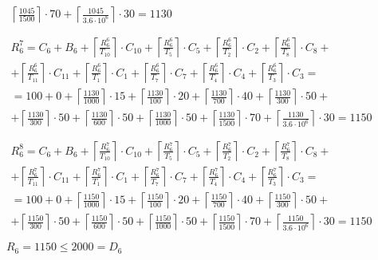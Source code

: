 \begin{gather*}
\begin{multlined}
    \left\lceil\frac{1045}{1500}\right\rceil\cdot 70 +%
    \left\lceil\frac{1045}{3.6 \cdot 10^6}\right\rceil\cdot 30 = 1130 \\
  \end{multlined} \\
  \begin{multlined}
    R_6^7 = C_6 + B_6 + \left\lceil\frac{R_6^6}{T_{10}}\right\rceil\cdot C_{10} + %
    \left\lceil\frac{R_6^6}{T_5}\right\rceil\cdot C_5 + %
    \left\lceil\frac{R_6^6}{T_2}\right\rceil\cdot C_2 + %
    \left\lceil\frac{R_6^6}{T_8}\right\rceil\cdot C_8 + \\%
    + \left\lceil\frac{R_6^6}{T_{11}}\right\rceil\cdot C_{11} + %
    \left\lceil\frac{R_6^6}{T_1}\right\rceil\cdot C_1 +%
    \left\lceil\frac{R_6^6}{T_7}\right\rceil\cdot C_7 +%
    \left\lceil\frac{R_6^6}{T_4}\right\rceil\cdot C_4 +%
    \left\lceil\frac{R_6^6}{T_3}\right\rceil\cdot C_3 = \\%
    = 100 + 0 + \left\lceil\frac{1130}{1000}\right\rceil\cdot 15 + %
    \left\lceil\frac{1130}{100}\right\rceil\cdot 20 + %
    \left\lceil\frac{1130}{700}\right\rceil\cdot 40 + %
    \left\lceil\frac{1130}{300}\right\rceil\cdot 50 + \\%
    + \left\lceil\frac{1130}{300}\right\rceil\cdot 50 + %
    \left\lceil\frac{1130}{600}\right\rceil\cdot 50 + %
    \left\lceil\frac{1130}{1000}\right\rceil\cdot 50 +%
    \left\lceil\frac{1130}{1500}\right\rceil\cdot 70 +%
    \left\lceil\frac{1130}{3.6 \cdot 10^6}\right\rceil\cdot 30 = 1150 \\
  \end{multlined} \\
  \begin{multlined}
    R_6^8 = C_6 + B_6 + \left\lceil\frac{R_6^7}{T_{10}}\right\rceil\cdot C_{10} + %
    \left\lceil\frac{R_6^7}{T_5}\right\rceil\cdot C_5 + %
    \left\lceil\frac{R_6^7}{T_2}\right\rceil\cdot C_2 + %
    \left\lceil\frac{R_6^7}{T_8}\right\rceil\cdot C_8 + \\%
    + \left\lceil\frac{R_6^7}{T_{11}}\right\rceil\cdot C_{11} + %
    \left\lceil\frac{R_6^7}{T_1}\right\rceil\cdot C_1 +%
    \left\lceil\frac{R_6^7}{T_7}\right\rceil\cdot C_7 +%
    \left\lceil\frac{R_6^7}{T_4}\right\rceil\cdot C_4 +%
    \left\lceil\frac{R_6^7}{T_3}\right\rceil\cdot C_3 = \\%
    = 100 + 0 + \left\lceil\frac{1150}{1000}\right\rceil\cdot 15 + %
    \left\lceil\frac{1150}{100}\right\rceil\cdot 20 + %
    \left\lceil\frac{1150}{700}\right\rceil\cdot 40 + %
    \left\lceil\frac{1150}{300}\right\rceil\cdot 50 + \\%
    + \left\lceil\frac{1150}{300}\right\rceil\cdot 50 + %
    \left\lceil\frac{1150}{600}\right\rceil\cdot 50 + %
    \left\lceil\frac{1150}{1000}\right\rceil\cdot 50 +%
    \left\lceil\frac{1150}{1500}\right\rceil\cdot 70 +%
    \left\lceil\frac{1150}{3.6 \cdot 10^6}\right\rceil\cdot 30 = 1150 \\
  \end{multlined} \\
  R_6 = 1150 \le 2000 = D_6
\end{gather*}

